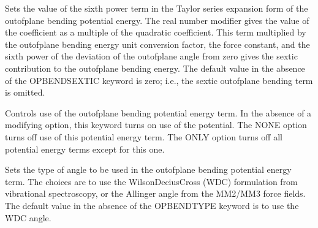 \documentclass[letterpaper,11pt,english]{sphinxmanual}
\begin{document}
\ignorespaces {}\label{\detokenize{text/keywords:key-opbend-sextic}}\begin{description}
\sphinxAtStartPar
Sets the value of the sixth power term in the Taylor series expansion form of the out\sphinxhyphen{}of\sphinxhyphen{}plane bending potential energy. The real number modifier gives the value of the coefficient as a multiple of the quadratic coefficient. This term multiplied by the out\sphinxhyphen{}of\sphinxhyphen{}plane bending energy unit conversion factor, the force constant, and the sixth power of the deviation of the out\sphinxhyphen{}of\sphinxhyphen{}plane angle from zero gives the sextic contribution to the out\sphinxhyphen{}of\sphinxhyphen{}plane bending energy. The default value in the absence of the OPBEND\sphinxhyphen{}SEXTIC keyword is zero; i.e., the sextic out\sphinxhyphen{}of\sphinxhyphen{}plane bending term is omitted.

\end{description}

\ignorespaces {}\label{\detokenize{text/keywords:key-opbendterm}}\begin{description}
\sphinxAtStartPar
Controls use of the out\sphinxhyphen{}of\sphinxhyphen{}plane bending potential energy term. In the absence of a modifying option, this keyword turns on use of the potential. The NONE option turns off use of this potential energy term. The ONLY option turns off all potential energy terms except for this one.

\end{description}

\ignorespaces {}\label{\detokenize{text/keywords:key-opbendtype}}\begin{description}
\sphinxAtStartPar
Sets the type of angle to be used in the out\sphinxhyphen{}of\sphinxhyphen{}plane bending potential energy term. The choices are to use the Wilson\sphinxhyphen{}Decius\sphinxhyphen{}Cross (W\sphinxhyphen{}D\sphinxhyphen{}C) formulation from vibrational spectroscopy, or the Allinger angle from the MM2/MM3 force fields. The default value in the absence of the OPBENDTYPE keyword is to use the W\sphinxhyphen{}D\sphinxhyphen{}C angle.

\end{description}
\end{document}
